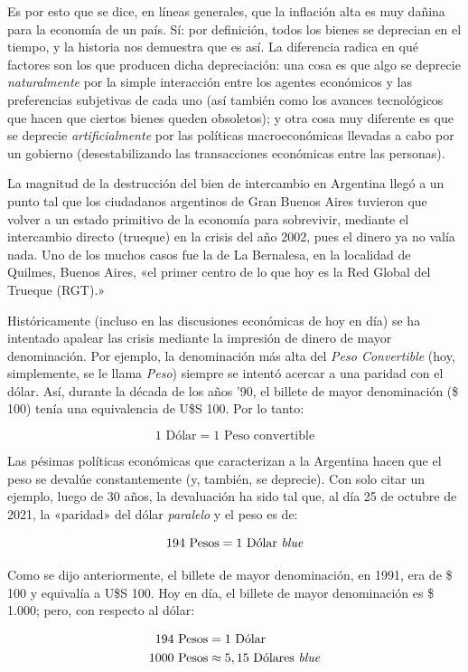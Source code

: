 \documentclass[12pt,a4paper,twoside]{book}
\begin{document}
Es por esto que se dice, en líneas generales, que la inflación alta es muy dañina para la economía de un país. Sí: por definición, todos los bienes se deprecian en el tiempo, y la historia nos demuestra que es así. La diferencia radica en qué factores son los que producen dicha depreciación: una cosa es que algo se deprecie \textit{naturalmente} por la simple interacción entre los agentes económicos y las preferencias subjetivas de cada uno (así también como los avances tecnológicos que hacen que ciertos bienes queden obsoletos); y otra cosa muy diferente es que se deprecie \textit{artificialmente} por las políticas macroeconómicas llevadas a cabo por un gobierno (desestabilizando las transacciones económicas entre las personas).

La magnitud de la destrucción del bien de intercambio en Argentina llegó a un punto tal que los ciudadanos argentinos de Gran Buenos Aires tuvieron que volver a un estado primitivo de la economía para sobrevivir, mediante el intercambio directo (trueque) en la crisis del año 2002, pues el dinero ya no valía nada. Uno de los muchos casos fue la de La Bernalesa, en la localidad de Quilmes, Buenos Aires, «el primer centro de lo que hoy es la Red Global del Trueque (RGT).» \cite{arg:trueque}

Históricamente (incluso en las discusiones económicas de hoy en día) se ha intentado apalear las crisis mediante la impresión de dinero de mayor denominación. Por ejemplo, la denominación más alta del \textit{Peso Convertible} (hoy, simplemente, se le llama \textit{Peso}) siempre se intentó acercar a una paridad con el dólar. Así, durante la década de los años '90, el billete de mayor denominación (\$ 100) tenía una equivalencia de U\$S 100. Por lo tanto:

\[
1 \text{ Dólar} = 1 \text{ Peso convertible}
\]

Las pésimas políticas económicas que caracterizan a la Argentina hacen que el peso se devalúe constantemente (y, también, se deprecie). Con solo citar un ejemplo, luego de 30 años, la devaluación ha sido tal que, al día 25 de octubre de 2021, la «paridad» del dólar \textit{paralelo} y el peso es de:

\[
194 \text{ Pesos} = 1 \text{ Dólar \textit{blue}}
\]

Como se dijo anteriormente, el billete de mayor denominación, en 1991, era de \$ 100 y equivalía a U\$S 100. Hoy en día, el billete de mayor denominación es \$ 1.000; pero, con respecto al dólar:

\begin{align*}
194 \text{ Pesos} &= 1 \text{ Dólar} \\
1000 \text{ Pesos} & \approx 5,15 \text{ Dólares \textit{blue}}
\end{align*}
\end{document}
